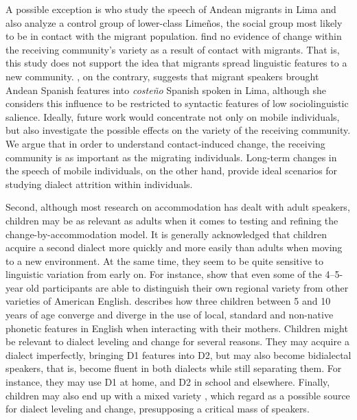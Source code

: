 \documentclass[output=paper]{langscibook}
\begin{document}
A possible exception is \citet{klee_andean_2006} who study the speech of Andean migrants in Lima and also analyze a control group of lower-class Limeños, the social group most likely to be in contact with the migrant population. \textcite{klee_andean_2006} find no evidence of change within the receiving community's variety as a result of contact with migrants. That is, this study does not support the idea that migrants spread linguistic features to a new community. \textcite{Escobar2007}, on the contrary, suggests that migrant speakers brought Andean Spanish features into \textit{costeño} Spanish spoken in Lima, although she considers this influence to be restricted to syntactic features of low sociolinguistic salience. Ideally, future work would concentrate not only on mobile individuals, but also investigate the possible effects on the variety of the receiving community. We argue that in order to understand contact-induced change, the receiving community is as important as the migrating individuals. Long-term changes in the speech of mobile individuals, on the other hand, provide ideal scenarios for studying dialect attrition within individuals.

Second, although most research on accommodation has dealt with adult speakers, children may be as relevant as adults when it comes to testing and refining the change-by-ac\-com\-mo\-dation model. It is generally acknowledged that children acquire a second dialect more quickly and more easily than adults \citep{siegel_second_2010} when moving to a new environment. At the same time, they seem to be quite sensitive to linguistic variation from early on. For instance, \textcite{jones_development_2017} show that even some of the 4--5-year old participants are able to distinguish their own regional variety from other varieties of American English. \textcite{khattab_phonetic_2013} describes how three children between 5 and 10 years of age converge and diverge in the use of local, standard and non-native phonetic features in English when interacting with their mothers. 
Children might be relevant to dialect leveling and change for several reasons. They may acquire a dialect imperfectly, bringing D1 features into D2, but may also become bidialectal speakers, that is, become fluent in both dialects while still separating them. For instance, they may use D1 at home, and D2 in school and elsewhere. Finally, children may also end up with a mixed variety \citep{chambers_dialect_1992,tagliamonte_howd_2007}, which \textcite{klee_andean_2006} regard as a possible source for dialect leveling and change, presupposing a critical mass of speakers.
\end{document}
